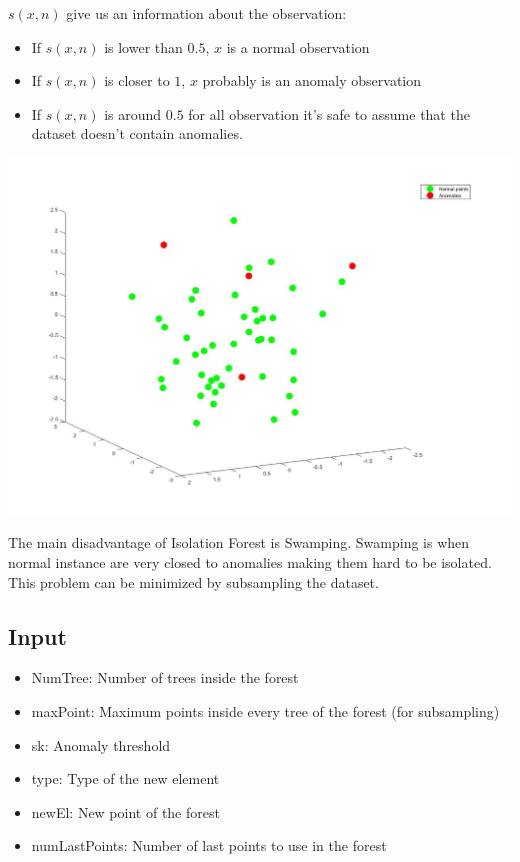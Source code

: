\documentclass[journal]{IEEEtran}
\begin{document}
\(s(x,n)\) give us an information about the observation:
\begin{itemize}
\item If \(s(x,n)\) is lower than \(0.5\), \(x\) is a normal observation
\item If \(s(x,n)\) is closer to \(1\), \(x\) probably is an anomaly observation
\item If \(s(x,n)\) is around \(0.5\) for all observation it's safe to assume that the dataset doesn't contain anomalies.
\end{itemize}

\begin{center}
\includegraphics[width=\columnwidth]{grafico.jpg}
\end{center}

The main disadvantage of Isolation Forest is Swamping. Swamping is when normal instance are very closed to anomalies making them hard to be isolated. This problem can be minimized by subsampling the dataset.

\subsection{Input}
\begin{itemize}
\item NumTree: Number of trees inside the forest 
\item maxPoint: Maximum points inside every tree of the forest (for subsampling)
\item sk: Anomaly threshold 
\item type: Type of the new element 
\item newEl: New point of the forest 
\item numLastPoints: Number of last points to use in the forest
\end{itemize}
\end{document}
